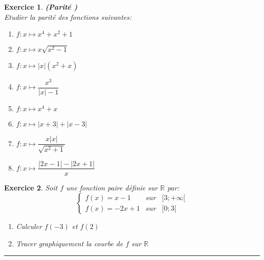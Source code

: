 \documentclass[twocolumn,french]{article}
\newcommand{\R}{\mathbb{R}}
\theoremstyle{plain}
\newtheorem{exo}{Exercice}%
\begin{document}
\begin{exo}
\textbf{\textit{ (Parité )}}\\
Etudier la parité des  fonctions suivantes:
\\
\begin{enumerate}
\item $f:x\longmapsto x^4+x^2+1 $
\\
\item $f:x\longmapsto x\sqrt{x^2-1}$
\\
\item $f:x\longmapsto |x|(x^2+x)$
\\
\item $f:x\longmapsto \dfrac{x^3}{|x|-1}$
\\
\item $f:x\longmapsto x^4+x $
\\
\item $f:x\longmapsto |x+3|+|x-3|$
\\
\item $f:x\longmapsto \dfrac{x|x|}{\sqrt{x^2+1}}$
\\
\item $f:x\longmapsto \dfrac{|2x-1|-|2x+1|}{x}$
\\
\end{enumerate}
\end{exo}

\newpage
\begin{exo}
Soit $f$ une fonction paire définie sur $\R$ par:
$$
\left\lbrace
	\begin{array}{lll}
	f(x)=x-1  &  sur  & [3;+\infty[  \\
	f(x)=-2x+1  &  sur  & [0;3[
	
	
	\end{array}
	\right.
$$

\begin{enumerate}
\item
Calculer $f(-3)$ et $f(2)$
\\
\item
Tracer graphiquement la courbe de $f$ sur $\R$
\\
\end{enumerate}

 
\end{exo}
\hrule
\end{document}
